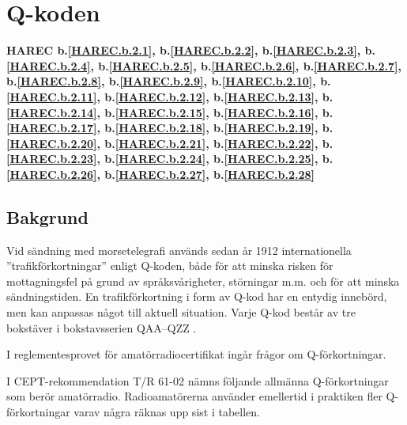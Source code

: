 \section{Q-koden}
\label{q-koden}
\textbf{
HAREC b.\ref{HAREC.b.2.1}\label{myHAREC.b.2.1},
 b.\ref{HAREC.b.2.2}\label{myHAREC.b.2.2},
 b.\ref{HAREC.b.2.3}\label{myHAREC.b.2.3},
 b.\ref{HAREC.b.2.4}\label{myHAREC.b.2.4},
 b.\ref{HAREC.b.2.5}\label{myHAREC.b.2.5},
 b.\ref{HAREC.b.2.6}\label{myHAREC.b.2.6},
 b.\ref{HAREC.b.2.7}\label{myHAREC.b.2.7},
 b.\ref{HAREC.b.2.8}\label{myHAREC.b.2.8},
 b.\ref{HAREC.b.2.9}\label{myHAREC.b.2.9},
 b.\ref{HAREC.b.2.10}\label{myHAREC.b.2.10},
 b.\ref{HAREC.b.2.11}\label{myHAREC.b.2.11},
 b.\ref{HAREC.b.2.12}\label{myHAREC.b.2.12},
 b.\ref{HAREC.b.2.13}\label{myHAREC.b.2.13},
 b.\ref{HAREC.b.2.14}\label{myHAREC.b.2.14},
 b.\ref{HAREC.b.2.15}\label{myHAREC.b.2.15},
 b.\ref{HAREC.b.2.16}\label{myHAREC.b.2.16},
 b.\ref{HAREC.b.2.17}\label{myHAREC.b.2.17},
 b.\ref{HAREC.b.2.18}\label{myHAREC.b.2.18},
 b.\ref{HAREC.b.2.19}\label{myHAREC.b.2.19},
 b.\ref{HAREC.b.2.20}\label{myHAREC.b.2.20},
 b.\ref{HAREC.b.2.21}\label{myHAREC.b.2.21},
 b.\ref{HAREC.b.2.22}\label{myHAREC.b.2.22},
 b.\ref{HAREC.b.2.23}\label{myHAREC.b.2.23},
 b.\ref{HAREC.b.2.24}\label{myHAREC.b.2.24},
 b.\ref{HAREC.b.2.25}\label{myHAREC.b.2.25},
 b.\ref{HAREC.b.2.26}\label{myHAREC.b.2.26},
 b.\ref{HAREC.b.2.27}\label{myHAREC.b.2.27},
 b.\ref{HAREC.b.2.28}\label{myHAREC.b.2.28}
}

\subsection{Bakgrund}

Vid sändning med morsetelegrafi används sedan år 1912 internationella
''trafikförkortningar'' enligt Q-koden, både för att minska risken för
mottagningsfel på grund av språksvårigheter, störningar m.m. och för
att minska sändningstiden. En trafikförkortning i form av Q-kod har en
entydig innebörd, men kan anpassas något till aktuell situation. Varje
Q-kod består av tre bokstäver i bokstavsserien QAA--QZZ \cite[M.1172]{ITU-RR}.

I reglementesprovet för amatörradiocertifikat ingår frågor om Q-förkortningar.

I CEPT-rekommendation T/R 61-02 \cite[Annex 6]{TR6102} nämns följande allmänna
Q-förkortningar som berör amatörradio. Radioamatörerna använder emellertid i
praktiken fler Q-förkortningar varav några räknas upp sist i tabellen.

